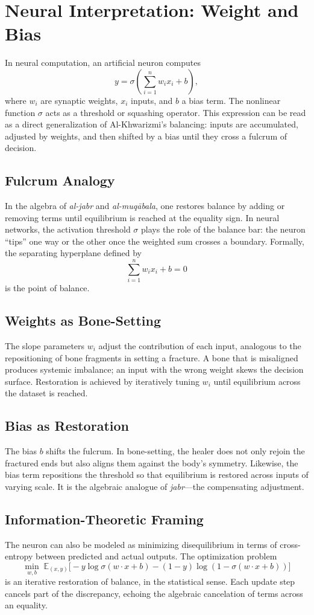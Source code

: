 \documentclass[a4paper,11pt,openany]{book}
\begin{document}
\section{Neural Interpretation: Weight and Bias}

In neural computation, an artificial neuron computes
\[
y = \sigma\!\left(\sum_{i=1}^n w_i x_i + b\right),
\]
where $w_i$ are synaptic weights, $x_i$ inputs, and $b$ a bias term. The nonlinear function 
$\sigma$ acts as a threshold or squashing operator. This expression can be read as a direct 
generalization of Al-Khwarizmi’s balancing: inputs are accumulated, adjusted by weights, and 
then shifted by a bias until they cross a fulcrum of decision.

\subsection*{Fulcrum Analogy}
In the algebra of \emph{al-jabr} and \emph{al-muqābala}, one restores balance by adding or 
removing terms until equilibrium is reached at the equality sign. In neural networks, the 
activation threshold $\sigma$ plays the role of the balance bar: the neuron “tips” one way or 
the other once the weighted sum crosses a boundary. Formally, the separating hyperplane 
defined by
\[
\sum_{i=1}^n w_i x_i + b = 0
\]
is the point of balance.

\subsection*{Weights as Bone-Setting}
The slope parameters $w_i$ adjust the contribution of each input, analogous to the 
repositioning of bone fragments in setting a fracture. A bone that is misaligned produces 
systemic imbalance; an input with the wrong weight skews the decision surface. Restoration is 
achieved by iteratively tuning $w_i$ until equilibrium across the dataset is reached.

\subsection*{Bias as Restoration}
The bias $b$ shifts the fulcrum. In bone-setting, the healer does not only rejoin the fractured 
ends but also aligns them against the body’s symmetry. Likewise, the bias term repositions the 
threshold so that equilibrium is restored across inputs of varying scale. It is the algebraic 
analogue of \emph{jabr}—the compensating adjustment.

\subsection*{Information-Theoretic Framing}
The neuron can also be modeled as minimizing disequilibrium in terms of cross-entropy between 
predicted and actual outputs. The optimization problem
\[
\min_{w,b} \; \mathbb{E}_{(x,y)}\big[-y\log \sigma(w\cdot x + b) - (1-y)\log(1-\sigma(w\cdot x + b))\big]
\]
is an iterative restoration of balance, in the statistical sense. Each update step cancels part 
of the discrepancy, echoing the algebraic cancelation of terms across an equality.
\end{document}
